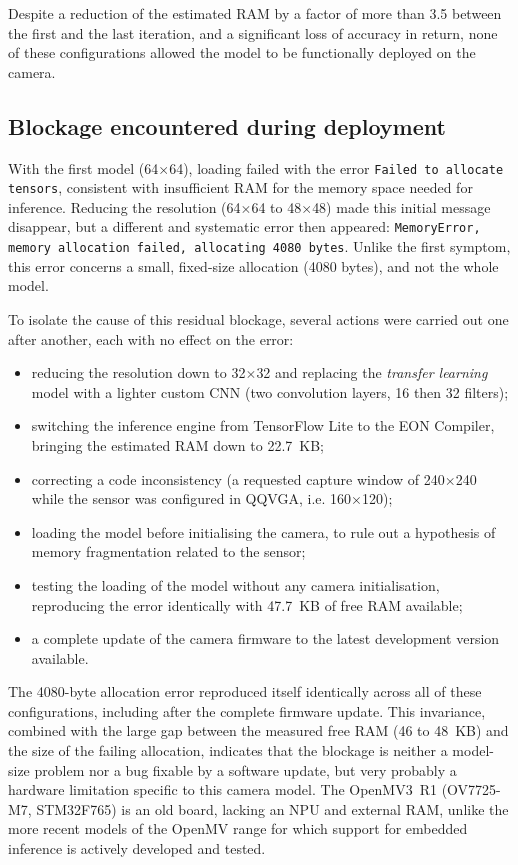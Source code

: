 \documentclass[12pt,a4paper]{report}
\begin{document}
	Despite a reduction of the estimated RAM by a factor of more than 3.5 between the first and the last iteration, and a significant loss of accuracy in return, none of these configurations allowed the model to be functionally deployed on the camera.
	
	\subsection*{Blockage encountered during deployment}
	
	With the first model (64$\times$64), loading failed with the error \texttt{Failed to allocate tensors}, consistent with insufficient RAM for the memory space needed for inference. Reducing the resolution (64$\times$64 to 48$\times$48) made this initial message disappear, but a different and systematic error then appeared: \texttt{MemoryError, memory allocation failed, allocating 4080 bytes}. Unlike the first symptom, this error concerns a small, fixed-size allocation (4080 bytes), and not the whole model.
	
	To isolate the cause of this residual blockage, several actions were carried out one after another, each with no effect on the error:
	
	\begin{itemize}
		\item reducing the resolution down to 32$\times$32 and replacing the \textit{transfer learning} model with a lighter custom CNN (two convolution layers, 16 then 32 filters);
		\item switching the inference engine from TensorFlow Lite to the EON Compiler, bringing the estimated RAM down to 22.7~KB;
		\item correcting a code inconsistency (a requested capture window of 240$\times$240 while the sensor was configured in QQVGA, i.e. 160$\times$120);
		\item loading the model before initialising the camera, to rule out a hypothesis of memory fragmentation related to the sensor;
		\item testing the loading of the model without any camera initialisation, reproducing the error identically with 47.7~KB of free RAM available;
		\item a complete update of the camera firmware to the latest development version available.
	\end{itemize}
	
	The 4080-byte allocation error reproduced itself identically across all of these configurations, including after the complete firmware update. This invariance, combined with the large gap between the measured free RAM (46 to 48~KB) and the size of the failing allocation, indicates that the blockage is neither a model-size problem nor a bug fixable by a software update, but very probably a hardware limitation specific to this camera model. The OpenMV3~R1 (OV7725-M7, STM32F765) is an old board, lacking an NPU and external RAM, unlike the more recent models of the OpenMV range for which support for embedded inference is actively developed and tested.
	
\end{document}
